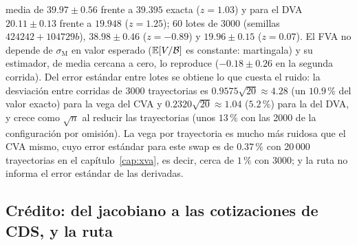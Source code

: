 \begin{sloppypar}
media de $39.97\pm0.56$ frente a $39.395$ exacta ($z=1.03$) y para el DVA $20.11\pm0.13$ frente a $19.948$ ($z=1.25$); 60
lotes de 3000 (semillas $424242+104729b$), $38.98\pm0.46$ ($z=-0.89$) y $19.96\pm0.15$ ($z=0.07$). El FVA no depende de
$\sigma_{\mathrm M}$ en valor esperado ($\mathbb{E}[V/\mathcal B]$ es constante: martingala) y su estimador, de media cercana a
cero, lo reproduce ($-0.18\pm0.26$ en la segunda corrida). Del error estándar entre lotes se obtiene lo que cuesta el
ruido: la desviación entre corridas de 3000 trayectorias es $0.9575\sqrt{20}\approx4.28$ (un $10.9\,\%$ del valor exacto)
para la vega del CVA y $0.2320\sqrt{20}\approx1.04$ ($5.2\,\%$) para la del DVA, y crece como $\sqrt{n}$ al reducir
las trayectorias (unos $13\,\%$ con las 2000 de la configuración por omisión). La vega por trayectoria es mucho más
ruidosa que el CVA mismo, cuyo error estándar para este swap es de $0.37\,\%$ con 20\,000 trayectorias en el
capítulo~\ref{cap:xva}, es decir, cerca de $1\,\%$ con 3000; y la ruta no informa el error estándar de las derivadas.

\subsection{Crédito: del jacobiano a las cotizaciones de CDS, y la ruta}\label{sec:cap16-ej-credito}


\end{sloppypar}
